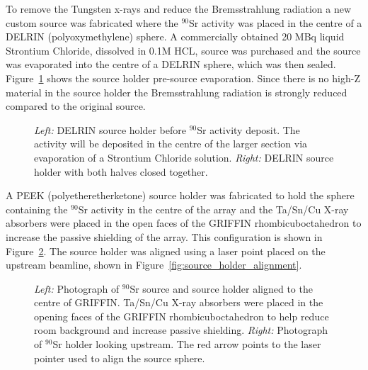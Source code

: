 \documentclass[cnatzke_thesis_proposal.tex]{subfiles}
\begin{document}
To remove the Tungsten x-rays and reduce the Bremsstrahlung radiation a new custom source was fabricated where the $^{90}$Sr activity was placed in the centre of a DELRIN (polyoxymethylene) sphere. 
A commercially obtained 20 MBq liquid Strontium Chloride, dissolved in 0.1M HCL, source was purchased and the source was evaporated into the centre of a DELRIN sphere, which was then sealed. 
Figure~\ref{fig:source_holder} shows the source holder pre-source evaporation. 
Since there is no high-Z material in the source holder the Bremsstrahlung radiation is strongly reduced compared to the original source. 


\begin{figure}[htbp]
  \centering
  \qquad
  \caption{
    \textit{Left:} DELRIN source holder before $^{90}$Sr activity deposit. The activity will be deposited in the centre of the larger section via evaporation of a Strontium Chloride solution. 
    \textit{Right:} DELRIN source holder with both halves closed together.
  }
  \label{fig:source_holder}
\end{figure}

A PEEK (polyetheretherketone) source holder was fabricated to hold the sphere containing the $^{90}$Sr activity in the centre of the array and the Ta/Sn/Cu X-ray absorbers were placed in the open faces of the GRIFFIN rhombicuboctahedron to increase the passive shielding of the array. This configuration is shown in Figure~\ref{fig:source_holder_in_griffin}. The source holder was aligned using a laser point placed on the upstream beamline, shown in Figure~\ref{fig:source_holder_alignment}.

\begin{figure}[htbp]
  \centering
  \qquad
  \caption{
    \textit{Left:} Photograph of $^{90}$Sr source and source holder aligned to the centre of GRIFFIN. Ta/Sn/Cu X-ray absorbers were placed in the opening faces of the GRIFFIN rhombicuboctahedron to help reduce room background and increase passive shielding.
    \textit{Right:} Photograph of $^{90}$Sr holder looking upstream. The red arrow points to the laser pointer used to align the source sphere.
  }
  \label{fig:source_holder_in_griffin}
\end{figure}


\end{document}
